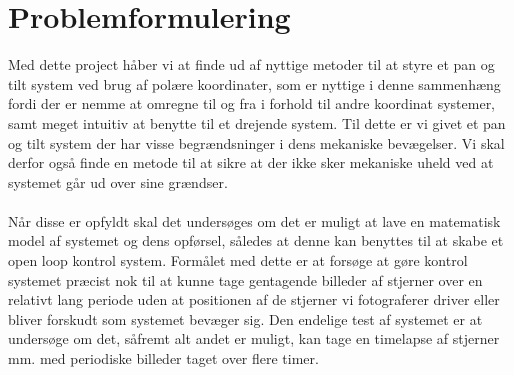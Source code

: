 \section{Problemformulering}

Med dette project håber vi at finde ud af nyttige metoder til at styre et pan og tilt system ved brug af polære koordinater, som er nyttige i denne sammenhæng fordi der er nemme at omregne til og fra i forhold til andre koordinat systemer, samt meget intuitiv at benytte til et drejende system. Til dette er vi givet et pan og tilt system der har visse begrændsninger i dens mekaniske bevægelser. Vi skal derfor også finde en metode til at sikre at der ikke sker mekaniske uheld ved at systemet går ud over sine grændser.
\\
\\
Når disse er opfyldt skal det undersøges om det er muligt at lave en matematisk model af systemet og dens opførsel, således at denne kan benyttes til at skabe et open loop kontrol system. Formålet med dette er at forsøge at gøre kontrol systemet præcist nok til at kunne tage gentagende billeder af stjerner over en relativt lang periode uden at positionen af de stjerner vi fotograferer driver eller bliver forskudt som systemet bevæger sig. Den endelige test af systemet er at undersøge om det, såfremt alt andet er muligt, kan tage en timelapse af stjerner mm. med periodiske billeder taget over flere timer.

